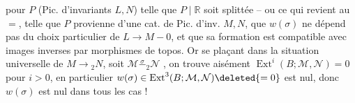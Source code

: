 pour  $P$ (Pic. d'invariants $L,N$) telle
que $P\mid\mathbb{R}$ soit splittée -- ou ce qui revient au
$=$, telle que $P$ provienne d'une cat. de Pic.
d'inv. $M,N$,  
que $w(\sigma)$ ne dépend pas du choix particulier
de $L\to M\mathbin{-}0$, et que sa formation est
 compatible avec  images inverses
par morphismes de topos. Or se plaçant
dans la situation universelle de $M\to{}_{2}N$,
 soit $\mathcal{M}\mathrel{\overset{\sigma}{-}}{}_{2}\mathcal{N}$ , on trouve
aisément $\operatorname{Ext}^{i}(B;\mathcal{M},\mathcal{N})=0$ pour $i>0$,
en particulier $w(\sigma)\in\operatorname{Ext}^{3}(B;\mathcal{M},\mathcal{N})\deleted{=0}$
est nul, donc $w(\sigma)$ est nul dans tous les
cas !
